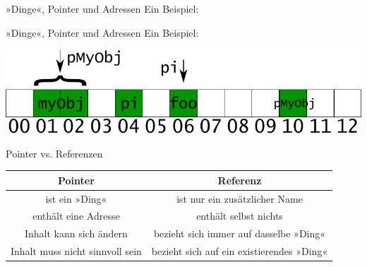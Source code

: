 	\begin{frame}[fragile]{»Dinge«, Pointer und Adressen}
		Ein Beispiel:
		
		{\footnotesize
		\begin{block}{}
			
		\end{block}
		}
		
		\vspace{1em}
	\end{frame}

	\begin{frame}[fragile]{»Dinge«, Pointer und Adressen}
		Ein Beispiel:
		
		{\footnotesize
		\begin{block}{}
			
		\end{block}
		}
		
		\pause
		\vspace{1em}
		
		\includegraphics[width=\linewidth]{images/object_points_addr}
	\end{frame}


\begin{frame}[fragile]{Pointer vs. Referenzen}
	\footnotesize
	\begin{tabular}{c|c}
		Pointer & Referenz \\ \hline
		ist ein »Ding« & ist nur ein zusätzlicher Name \\
		enthält eine Adresse & enthält selbst nichts \\
		Inhalt kann sich ändern & bezieht sich immer auf dasselbe »Ding« \\
		Inhalt muss nicht sinnvoll sein & bezieht sich auf ein existierendes »Ding« \\
	\end{tabular}
	
	\pause
	
	{\footnotesize
	\begin{block}{}
		
	\end{block}
	}
\end{frame}
